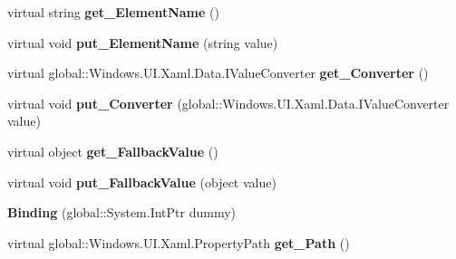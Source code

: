 \begin{DoxyCompactItemize}
virtual string {\bfseries get\+\_\+\+Element\+Name} ()
\item 
\mbox{\label{class_windows_1_1_u_i_1_1_xaml_1_1_data_1_1_binding_aabd010dd96a55bf922196a78fe1ad2ed}} 
virtual void {\bfseries put\+\_\+\+Element\+Name} (string value)
\item 
\mbox{\label{class_windows_1_1_u_i_1_1_xaml_1_1_data_1_1_binding_a75056d5c72401518166caead820596d9}} 
virtual global\+::\+Windows.\+U\+I.\+Xaml.\+Data.\+I\+Value\+Converter {\bfseries get\+\_\+\+Converter} ()
\item 
\mbox{\label{class_windows_1_1_u_i_1_1_xaml_1_1_data_1_1_binding_a5721074cd9c3ec7e50bd6d5b645234e7}} 
virtual void {\bfseries put\+\_\+\+Converter} (global\+::\+Windows.\+U\+I.\+Xaml.\+Data.\+I\+Value\+Converter value)
\item 
\mbox{\label{class_windows_1_1_u_i_1_1_xaml_1_1_data_1_1_binding_a907080aef9cb5f5df15684599707b3ba}} 
virtual object {\bfseries get\+\_\+\+Fallback\+Value} ()
\item 
\mbox{\label{class_windows_1_1_u_i_1_1_xaml_1_1_data_1_1_binding_ac1d4f41e87949cd4ffad38415709db6c}} 
virtual void {\bfseries put\+\_\+\+Fallback\+Value} (object value)
\item 
\mbox{\label{class_windows_1_1_u_i_1_1_xaml_1_1_data_1_1_binding_ae314033417c6ca80ae3826ead1750150}} 
{\bfseries Binding} (global\+::\+System.\+Int\+Ptr dummy)
\item 
\mbox{\label{class_windows_1_1_u_i_1_1_xaml_1_1_data_1_1_binding_a3670a1efb4d8824b1bc00bd91af01fc2}} 
virtual global\+::\+Windows.\+U\+I.\+Xaml.\+Property\+Path {\bfseries get\+\_\+\+Path} ()
\item 
\mbox{\label{class_windows_1_1_u_i_1_1_xaml_1_1_data_1_1_binding_a9f8d22b6891219f8db424a49a91ff24a}} 

\end{DoxyCompactItemize}
